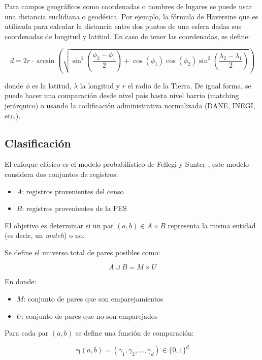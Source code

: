 \documentclass[
  12pt,
]{book}
\providecommand{\tightlist}{%
  \setlength{\itemsep}{0pt}\setlength{\parskip}{0pt}}
\begin{document}
Para campos geográficos como coordenadas o nombres de lugares se puede usar una distancia euclidiana o geodésica. Por ejemplo, la fórmula de Haversine que es utilizada para calcular la distancia entre dos puntos de una esfera dadas sus coordenadas de longitud y latitud. En caso de tener las coordenadas, se define:

\[d = 2r \cdot \arcsin\left( \sqrt{\sin^2\left(\frac{\phi_2 - \phi_1}{2}\right) + \cos(\phi_1) \cos(\phi_2) \sin^2\left(\frac{\lambda_2 - \lambda_1}{2}\right)} \right)\]

donde \(\phi\) es la latitud, \(\lambda\) la longitud y \(r\) el radio de la Tierra. De igual forma, se puede hacer una comparación desde nivel país hasta nivel barrio (matching jerárquico) o usando la codificación administrativa normalizada (DANE, INEGI, etc.).

\subsection{Clasificación}\label{clasificaciuxf3n}

El enfoque clásico es el modelo probabilístico de Fellegi y Sunter \citep{fellegi1969theory}, este modelo considera dos conjuntos de registros:

\begin{itemize}
\tightlist
\item
  \(A\): registros provenientes del censo
\item
  \(B\): registros provenientes de la PES
\end{itemize}

El objetivo es determinar si un par \((a, b) \in A \times B\) representa la misma entidad (es decir, un \emph{match}) o no.

Se define el universo total de pares posibles como:

\[A \cup B = M \times U\]

En donde:

\begin{itemize}
\tightlist
\item
  \(M\): conjunto de pares que son emparejamientos
\item
  \(U\): conjunto de pares que no son emparejados
\end{itemize}

Para cada par \((a, b)\) se define una función de comparación:

\[\boldsymbol{\gamma}(a, b) = (\gamma_1, \gamma_2, \dots, \gamma_d) \in \{0,1\}^d\]
\end{document}
